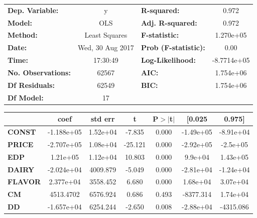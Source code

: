 \documentclass{article}
\begin{document}
\begin{center}
\begin{tabular}{lclc}
\toprule
\textbf{Dep. Variable:}    &        y         & \textbf{  R-squared:         } &      0.972    \\
\textbf{Model:}            &       OLS        & \textbf{  Adj. R-squared:    } &      0.972    \\
\textbf{Method:}           &  Least Squares   & \textbf{  F-statistic:       } &  1.270e+05    \\
\textbf{Date:}             & Wed, 30 Aug 2017 & \textbf{  Prob (F-statistic):} &      0.00     \\
\textbf{Time:}             &     17:30:49     & \textbf{  Log-Likelihood:    } & -8.7714e+05   \\
\textbf{No. Observations:} &       62567      & \textbf{  AIC:               } &  1.754e+06    \\
\textbf{Df Residuals:}     &       62549      & \textbf{  BIC:               } &  1.754e+06    \\
\textbf{Df Model:}         &          17      & \textbf{                     } &               \\
\bottomrule
\end{tabular}
\begin{tabular}{lcccccc}
               & \textbf{coef} & \textbf{std err} & \textbf{t} & \textbf{P$>$$|$t$|$} & \textbf{[0.025} & \textbf{0.975]}  \\
\midrule
\textbf{CONST} &   -1.188e+05  &     1.52e+04     &    -7.835  &         0.000        &    -1.49e+05    &    -8.91e+04     \\
\textbf{PRICE}    &   -2.707e+05  &     1.08e+04     &   -25.121  &         0.000        &    -2.92e+05    &     -2.5e+05     \\
\textbf{EDP}    &     1.21e+05  &     1.12e+04     &    10.803  &         0.000        &      9.9e+04    &     1.43e+05     \\
\textbf{DAIRY}    &   -2.024e+04  &     4009.879     &    -5.049  &         0.000        &    -2.81e+04    &    -1.24e+04     \\
\textbf{FLAVOR}    &    2.377e+04  &     3558.452     &     6.680  &         0.000        &     1.68e+04    &     3.07e+04     \\
\textbf{CM}    &    4513.4702  &     6576.924     &     0.686  &         0.493        &    -8377.314    &     1.74e+04     \\
\textbf{DD}    &   -1.657e+04  &     6254.244     &    -2.650  &         0.008        &    -2.88e+04    &    -4315.086     \\

\end{tabular}
\end{center}
\end{document}
